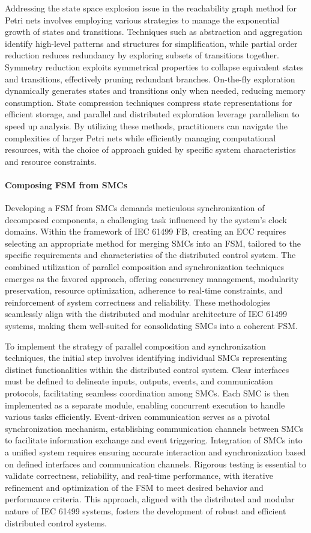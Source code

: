 \documentclass{ieeeojies}
\begin{document}
Addressing the state space explosion issue in the reachability graph method for Petri nets involves employing various strategies to manage the exponential growth of states and transitions. Techniques such as abstraction and aggregation identify high-level patterns and structures for simplification, while partial order reduction reduces redundancy by exploring subsets of transitions together. Symmetry reduction exploits symmetrical properties to collapse equivalent states and transitions, effectively pruning redundant branches. On-the-fly exploration dynamically generates states and transitions only when needed, reducing memory consumption. State compression techniques compress state representations for efficient storage, and parallel and distributed exploration leverage parallelism to speed up analysis. By utilizing these methods, practitioners can navigate the complexities of larger Petri nets while efficiently managing computational resources, with the choice of approach guided by specific system characteristics and resource constraints.

\paragraph{Composing FSM from SMCs}
Developing a FSM from SMCs demands meticulous synchronization of decomposed components, a challenging task influenced by the system's clock domains. Within the framework of IEC 61499 FB, creating an ECC requires selecting an appropriate method for merging SMCs into an FSM, tailored to the specific requirements and characteristics of the distributed control system. The combined utilization of parallel composition and synchronization techniques emerges as the favored approach, offering concurrency management, modularity preservation, resource optimization, adherence to real-time constraints, and reinforcement of system correctness and reliability. These methodologies seamlessly align with the distributed and modular architecture of IEC 61499 systems, making them well-suited for consolidating SMCs into a coherent FSM.

To implement the strategy of parallel composition and synchronization techniques, the initial step involves identifying individual SMCs representing distinct functionalities within the distributed control system. Clear interfaces must be defined to delineate inputs, outputs, events, and communication protocols, facilitating seamless coordination among SMCs. Each SMC is then implemented as a separate module, enabling concurrent execution to handle various tasks efficiently. Event-driven communication serves as a pivotal synchronization mechanism, establishing communication channels between SMCs to facilitate information exchange and event triggering. Integration of SMCs into a unified system requires ensuring accurate interaction and synchronization based on defined interfaces and communication channels. Rigorous testing is essential to validate correctness, reliability, and real-time performance, with iterative refinement and optimization of the FSM to meet desired behavior and performance criteria. This approach, aligned with the distributed and modular nature of IEC 61499 systems, fosters the development of robust and efficient distributed control systems.
\end{document}
